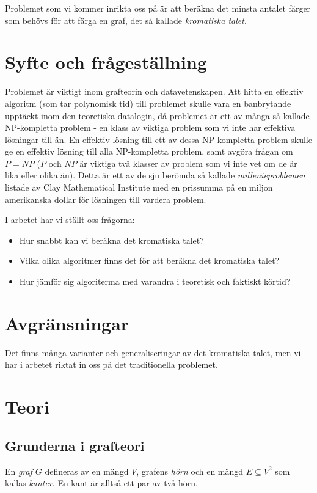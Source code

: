 \documentclass[a4paper]{report}
\begin{document}
Problemet som vi kommer inrikta oss på är att beräkna det minsta antalet färger som behövs för att färga en graf, det så kallade \emph{kromatiska talet}.

\section{Syfte och frågeställning}
Problemet är viktigt inom grafteorin och datavetenskapen. Att hitta en effektiv algoritm (som tar polynomisk tid) till problemet skulle vara en banbrytande upptäckt inom den teoretiska datalogin, då problemet är ett av många så kallade NP-kompletta problem - en klass av viktiga problem som vi inte har effektiva lösningar till än. En effektiv lösning till
ett av dessa NP-kompletta problem skulle ge en effektiv lösning till alla NP-kompletta problem, samt avgöra frågan om $P = NP$ ($P$ och $NP$ är viktiga två klasser av problem som vi inte vet om de är lika eller olika än). Detta är ett av de sju berömda så kallade \emph{millenieproblemen} listade av Clay Mathematical Institute  med en prissumma på en miljon amerikanska dollar för lösningen till vardera problem.

I arbetet har vi ställt oss frågorna:
\begin{itemize}
\item Hur snabbt kan vi beräkna det kromatiska talet?
\item Vilka olika algoritmer finns det för att beräkna det kromatiska talet?
\item Hur jämför sig algoriterma med varandra i teoretisk och faktiskt körtid?
\end{itemize}

\section{Avgränsningar}
Det finns många varianter och generaliseringar av det kromatiska talet, men vi har i arbetet riktat in oss på det traditionella problemet.

\section{Teori}

\subsection{Grunderna i grafteori}

En \emph{graf} $G$ defineras av en mängd $V$, grafens \emph{hörn} och en mängd $E \subseteq V^2$ som kallas \emph{kanter}. En kant är alltså ett par av två hörn.
\end{document}
